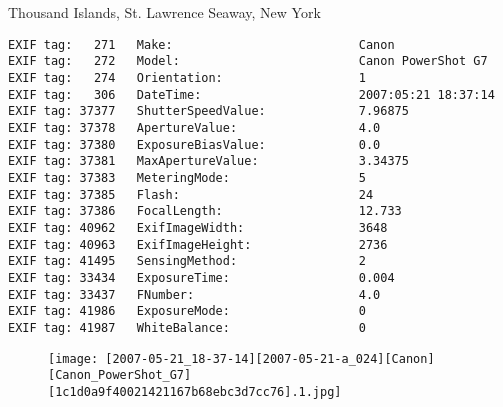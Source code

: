 \section{\protect{}}
\noindent Thousand Islands, St. Lawrence Seaway, New York
\noindent
\begin{lstlisting}
EXIF tag:   271   Make:                          Canon
EXIF tag:   272   Model:                         Canon PowerShot G7
EXIF tag:   274   Orientation:                   1
EXIF tag:   306   DateTime:                      2007:05:21 18:37:14
EXIF tag: 37377   ShutterSpeedValue:             7.96875
EXIF tag: 37378   ApertureValue:                 4.0
EXIF tag: 37380   ExposureBiasValue:             0.0
EXIF tag: 37381   MaxApertureValue:              3.34375
EXIF tag: 37383   MeteringMode:                  5
EXIF tag: 37385   Flash:                         24
EXIF tag: 37386   FocalLength:                   12.733
EXIF tag: 40962   ExifImageWidth:                3648
EXIF tag: 40963   ExifImageHeight:               2736
EXIF tag: 41495   SensingMethod:                 2
EXIF tag: 33434   ExposureTime:                  0.004
EXIF tag: 33437   FNumber:                       4.0
EXIF tag: 41986   ExposureMode:                  0
EXIF tag: 41987   WhiteBalance:                  0

\end{lstlisting}
\clearpage
\begin{figure}
\raggedleft
\texttt{[image: [2007-05-21\_18-37-14][2007-05-21-a\_024][Canon][Canon\_PowerShot\_G7][1c1d0a9f40021421167b68ebc3d7cc76].1.jpg]}
\end{figure}


\clearpage

